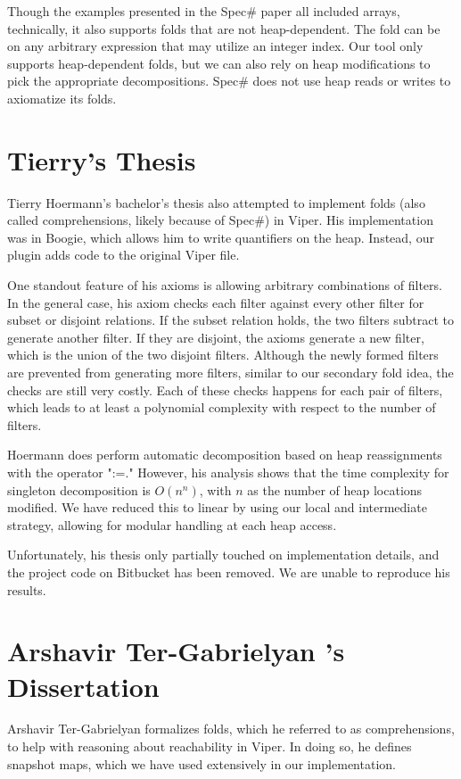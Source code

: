 \documentclass[msc,oneside]{ubcthesis}
\theoremstyle{definition}
\begin{document}
Though the examples presented in the Spec\# paper all included arrays, technically, it also supports folds that are not heap-dependent. The fold can be on any arbitrary expression that may utilize an integer index. Our tool only supports heap-dependent folds, but we can also rely on heap modifications to pick the appropriate decompositions. Spec\# does not use heap reads or writes to axiomatize its folds.

\section{Tierry's Thesis}
Tierry Hoermann's bachelor’s thesis also attempted to implement folds (also called comprehensions, likely because of Spec\#) in Viper. His implementation was in Boogie, which allows him to write quantifiers on the heap. Instead, our plugin adds code to the original Viper file. 

One standout feature of his axioms is allowing arbitrary combinations of filters. In the general case, his axiom checks each filter against every other filter for subset or disjoint relations. If the subset relation holds, the two filters subtract to generate another filter. If they are disjoint, the axioms generate a new filter, which is the union of the two disjoint filters. Although the newly formed filters are prevented from generating more filters, similar to our secondary fold idea, the checks are still very costly. Each of these checks happens for each pair of filters, which leads to at least a polynomial complexity with respect to the number of filters.

Hoermann does perform automatic decomposition based on heap reassignments with the operator ":=." However, his analysis shows that the time complexity for singleton decomposition is $O(n^n)$, with $n$ as the number of heap locations modified. We have reduced this to linear by using our local and intermediate strategy, allowing for modular handling at each heap access. 

Unfortunately, his thesis only partially touched on implementation details, and the project code on Bitbucket has been removed. We are unable to reproduce his results.

\section{Arshavir Ter-Gabrielyan 's Dissertation}
Arshavir Ter-Gabrielyan formalizes folds, which he referred to as comprehensions, to help with reasoning about reachability in Viper. In doing so, he defines snapshot maps, which we have used extensively in our implementation.
\end{document}
